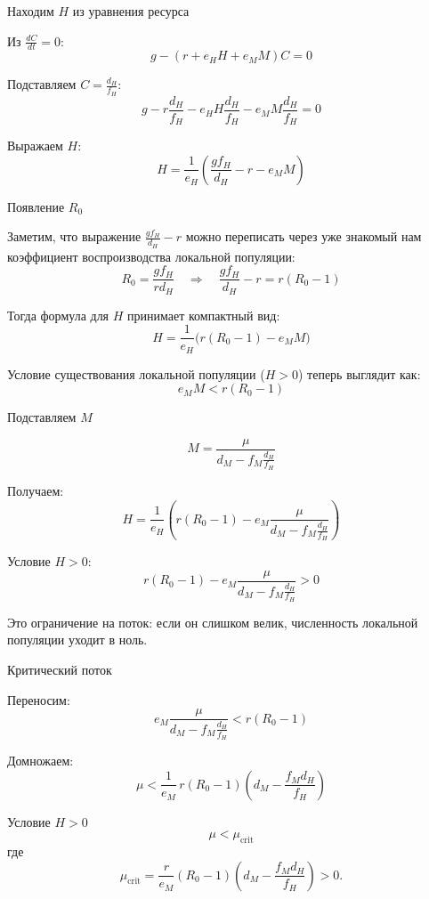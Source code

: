 \documentclass[12pt]{beamer}
\begin{document}
\begin{frame}{Находим $H$ из уравнения ресурса}

Из $\frac{dC}{dt}=0$:
\[g - (r + e_H H + e_M M)C = 0\]

Подставляем $C = \frac{d_H}{f_H}$:
\[g - r\frac{d_H}{f_H} - e_H H \frac{d_H}{f_H} - e_M M \frac{d_H}{f_H} = 0\]

Выражаем $H$:
\[H = \frac{1}{e_H}\left(\frac{g f_H}{d_H} - r - e_M M\right)\]

\end{frame}

\begin{frame}{Появление $R_0$}

Заметим, что выражение $\frac{g f_H}{d_H} - r$ можно переписать через уже знакомый нам коэффициент воспроизводства локальной популяции:
\[R_0 = \frac{g f_H}{r d_H}\quad\Longrightarrow\quad \frac{g f_H}{d_H} - r = r(R_0 - 1)\]

Тогда формула для $H$ принимает компактный вид:
\[H = \frac{1}{e_H}\bigl(r(R_0 - 1) - e_M M\bigr)\]

Условие существования локальной популяции ($H>0$) теперь выглядит как:
\[e_M M < r(R_0 - 1)\]

\end{frame}

\begin{frame}{Подставляем $M$}

\[M = \frac{\mu}{d_M - f_M \frac{d_H}{f_H}}\]

Получаем:
\[H = \frac{1}{e_H}\left(r(R_0 - 1) 
      - e_M \frac{\mu}{d_M - f_M \frac{d_H}{f_H}}\right)\]

Условие $H > 0$:
\[r(R_0 - 1) - e_M 
      \frac{\mu}{d_M - f_M \frac{d_H}{f_H}} > 0\]

Это ограничение на поток: если он слишком велик, численность локальной популяции уходит в ноль.

\end{frame}

\begin{frame}{Критический поток}

Переносим:
\[e_M \frac{\mu}{d_M - f_M \frac{d_H}{f_H}} < r(R_0 - 1)\]

Домножаем:
\[\mu < \frac{1}{e_M}\, r(R_0 - 1)\left(d_M - \frac{f_M d_H}{f_H}\right)\]

\begin{exampleblock}{Условие $H > 0$}
\[\mu < \mu_{\text{crit}}\]
где 
\[\mu_{\text{crit}} = \frac{r}{e_M}(R_0 - 1)\left(d_M - \frac{f_M d_H}{f_H}\right) > 0.\]
\end{exampleblock}

\end{frame}
\end{document}
